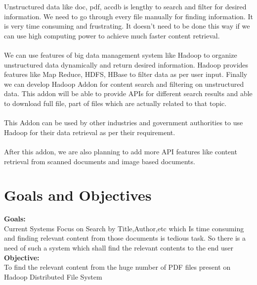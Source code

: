 \documentclass[oneside,a4paper,12pt]{report}
\begin{document}
Unstructured data like doc, pdf, accdb is lengthy to search and filter for desired information. We need to go through every file manually for finding information. It is very time consuming and frustrating. It doesn’t need to be done this way if we can use high computing power to achieve much faster content retrieval.\\\\
We can use features of big data management system like Hadoop to organize unstructured data dynamically and return desired information. Hadoop provides features like Map Reduce, HDFS, HBase to filter data as per user input. Finally we can develop Hadoop Addon for content search and filtering on unstructured data. This addon will be able to provide APIs for different search results and able to download full file, part of files which are actually related to that topic.\\\\
This Addon can be used by other industries and government authorities to use Hadoop for their data retrieval as per their requirement.\\\\
After this addon, we are also planning to add more API features like content retrieval from scanned documents and image based documents.

\section{Goals and Objectives}
\textbf{Goals:} \\
Current Systems Focus on Search by Title,Author,etc which Is time consuming and finding relevant content from those documents is tedious task. So there is a need of such a system which shall find the relevant contents to the end user \\

\noindent \textbf{Objective:} \\
To find the relevant content from the huge number of PDF files present on Hadoop Distributed File System \\

	
\end{document}
